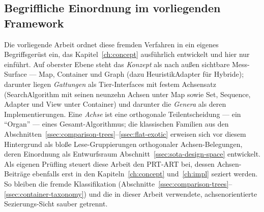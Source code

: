 \subsection{Begriffliche Einordnung im vorliegenden Framework}\label{ssec:own-framework}
Die vorliegende Arbeit ordnet diese fremden Verfahren in ein eigenes Begriffsgerüst ein, das
Kapitel~\ref{ch:concept} ausführlich entwickelt und hier nur einführt. Auf oberster Ebene steht das
\emph{Konzept} als nach außen sichtbare Mess-Surface --- Map, Container und Graph (dazu HeuristikAdapter
für Hybride); darunter liegen \emph{Gattungen} als Tier-Interfaces mit festem Achsensatz (SearchAlgorithm
mit seinen neunzehn Achsen unter Map sowie Set, Sequence, Adapter und View unter Container) und darunter
die \emph{Genera} als deren Implementierungen. Eine
\emph{Achse} ist eine orthogonale Teilentscheidung --- ein \enquote{Organ} --- eines
Gesamt-Algorithmus; die klassischen Familien aus den
Abschnitten~\ref{ssec:comparison-trees}--\ref{ssec:flat-exotic} erweisen sich vor diesem Hintergrund
als bloße Lese-Gruppierungen orthogonaler Achsen-Belegungen, deren Einordnung als Entwurfsraum
Abschnitt~\ref{ssec:sota-design-space} entwickelt. Als eigenen Prüfling steuert diese Arbeit den
PRT-ART bei, dessen Achsen-Beiträge ebenfalls erst in den Kapiteln~\ref{ch:concept}
und~\ref{ch:impl} seziert werden. So bleiben die fremde Klassifikation
(Abschnitte~\ref{ssec:comparison-trees}--\ref{ssec:container-taxonomy}) und die in dieser Arbeit
verwendete, achsenorientierte Sezierungs-Sicht sauber getrennt.

